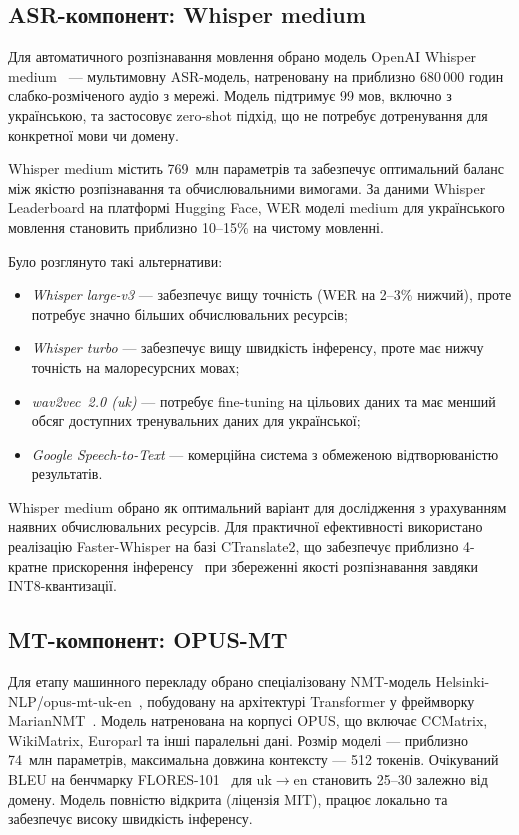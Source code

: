 \subsection{ASR-компонент: Whisper medium}

Для автоматичного розпізнавання мовлення обрано модель OpenAI Whisper
medium~\cite{whisper} --- мультимовну ASR-модель, натреновану на
приблизно 680\,000 годин слабко-розміченого аудіо з мережі. Модель
підтримує 99 мов, включно з українською, та застосовує zero-shot підхід,
що не потребує дотренування для конкретної мови чи домену.

Whisper medium містить 769~млн параметрів та забезпечує оптимальний
баланс між якістю розпізнавання та обчислювальними вимогами. За даними
Whisper Leaderboard на платформі Hugging Face, WER моделі medium для
українського мовлення становить приблизно 10--15\% на чистому мовленні.

Було розглянуто такі альтернативи:
\begin{itemize}[nosep]
    \item \textit{Whisper large-v3} --- забезпечує вищу точність (WER на
    2--3\% нижчий), проте потребує значно більших обчислювальних ресурсів;
    \item \textit{Whisper turbo} --- забезпечує вищу швидкість інференсу,
    проте має нижчу точність на малоресурсних мовах;
    \item \textit{wav2vec~2.0 (uk)} --- потребує fine-tuning на цільових
    даних та має менший обсяг доступних тренувальних даних для української;
    \item \textit{Google Speech-to-Text} --- комерційна система з
    обмеженою відтворюваністю результатів.
\end{itemize}

Whisper medium обрано як оптимальний варіант для дослідження з урахуванням
наявних обчислювальних ресурсів. Для практичної
ефективності використано реалізацію Faster-Whisper на базі CTranslate2,
що забезпечує приблизно 4-кратне прискорення інференсу~\cite{ctranslate2}
при збереженні якості розпізнавання завдяки INT8-квантизації.

\subsection{MT-компонент: OPUS-MT}

Для етапу машинного перекладу обрано спеціалізовану NMT-модель
Helsinki-NLP/opus-mt-uk-en~\cite{opus_mt}, побудовану на архітектурі
Transformer у фреймворку MarianNMT~\cite{marian_nmt}. Модель натренована
на корпусі OPUS, що включає CCMatrix, WikiMatrix, Europarl та інші
паралельні дані. Розмір моделі --- приблизно 74~млн параметрів, максимальна
довжина контексту --- 512 токенів. Очікуваний BLEU на бенчмарку
FLORES-101~\cite{flores} для uk$\to$en становить 25--30 залежно від домену.
Модель повністю відкрита (ліцензія MIT), працює локально та забезпечує
високу швидкість інференсу.

